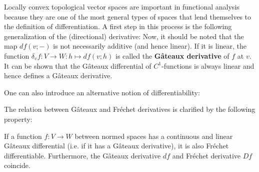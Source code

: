     Locally convex topological vector spaces are important in functional analysis because they are one of the most general types of spaces that lend themselves to the definition of differentiation. A first step in this process is the following generalization of the (directional) derivative:
    Now, it should be noted that the map $df(v;-)$ is not necessarily additive (and hence linear). If it is linear, the function $\delta_vf:V\rightarrow W:h\mapsto df(v;h)$ is called the \textbf{G\^ateaux derivative} of $f$ at $v$. It can be shown that the G\^ateaux differential of $C^1$-functions is always linear and hence defines a G\^ateaux derivative.

    One can also introduce an alternative notion of differentiability:

    The relation between G\^ateaux and Fr\'echet derivatives is clarified by the following property:
    \begin{property}
        If a function $f:V\rightarrow W$ between normed spaces has a continuous and linear G\^ateaux differential (i.e. if it has a G\^ateaux derivative), it is also Fr\'echet differentiable. Furthermore, the G\^ateaux derivative $df$ and Fr\'echet derivative $Df$ coincide.
    \end{property}

